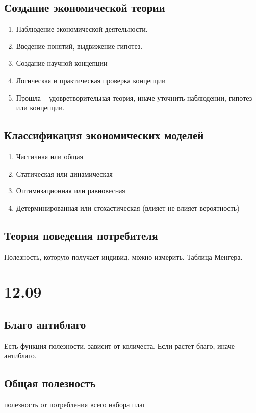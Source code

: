 \documentclass[14pt]{extarticle}
\begin{document}
\subsection{Создание экономической теории}
\begin{enumerate}
	\item Наблюдение экономической деятельности.
	\item Введение понятий, выдвижение гипотез.
	\item Создание научной концепции
	\item Логическая и практическая проверка концепции
	\item Прошла -- удовретворительная теория, иначе уточнить наблюдении, гипотез или концепции.
\end{enumerate}
\subsection{Классификация экономических моделей}
\begin{enumerate}
	\item Частичная или общая
	\item Статическая или динамическая
	\item Оптимизационная или равновесная
	\item Детерминированная или стохастическая (влияет не влияет вероятность)
\end{enumerate}
\subsection{Теория поведения потребителя}
Полезность, которую получает индивид, можно измерить.
Таблица Менгера.
\section{12.09}
\subsection{Благо антиблаго}
Есть функция полезности, зависит от количеста. Если растет благо, иначе антиблаго.
\subsection{Общая полезность}
полезность от потребления всего набора плаг
\end{document}
